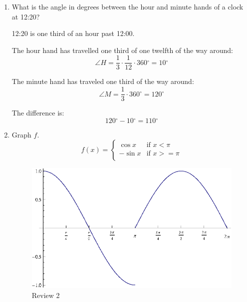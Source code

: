 \documentclass{exam}
\newcommand{\dg}{\ensuremath{^\circ}}
\begin{document}
  \begin{enumerate}
    \item What is the angle in degrees between the hour and minute hands of a clock at 12:20?

      \begin{solution}
        12:20 is one third of an hour past 12:00.  
        
        The hour hand has travelled one third of one twelfth of the way around:
        \[
          \angle H = \frac{1}{3} \cdot \frac{1}{12} \cdot 360 \dg = 10 \dg
        \]

        The minute hand has traveled one third of the way around:
        \[
          \angle M = \frac{1}{3} \cdot 360 \dg = 120 \dg
        \]

        The difference is:
        \[
          120 \dg - 10 \dg = 110 \dg
        \]

      \end{solution}

    \item Graph $f$.
      \[
        f(x) = 
        \begin{cases}
           \cos x  & \text{if } x < \pi \\
          - \sin x & \text{if } x >= \pi \\
        \end{cases}
      \]

      \begin{solution}
        \begin{figure}[H]
          \centering
          \includegraphics[scale=0.6]{review.eps}
          \caption{Review 2}
        \end{figure}
      \end{solution}

  \end{enumerate}
\end{document}
